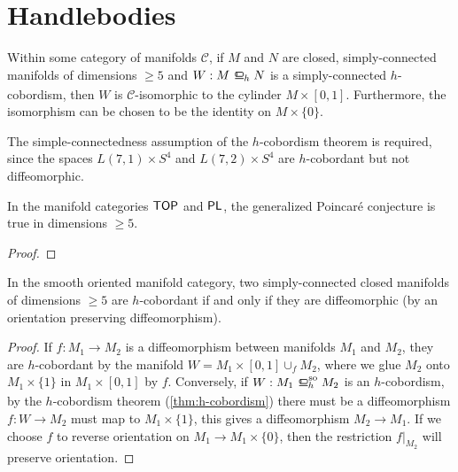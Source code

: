 \section{Handlebodies}

\begin{theorem}[$h$-cobordism]\label{thm:h-cobordism}
	Within some category of manifolds $\mathscr{C}$, if $M$ and $N$ are closed, simply-connected manifolds of dimensions $\geq 5$ and $W : M \hbord N$ is a simply-connected $h$-cobordism, then $W$ is $\mathscr{C}$-isomorphic to the cylinder $M\times [0,1]$. Furthermore, the isomorphism can be chosen to be the identity on $M\times \{0\}$.
\end{theorem}

\begin{example}
	The simple-connectedness assumption of the $h$-cobordism theorem is required, since the spaces $L(7,1)\times S^4$ and $L(7,2)\times S^4$ are $h$-cobordant but not diffeomorphic.
\end{example}

\begin{theorem}
	In the manifold categories $\mathsf{TOP}$ and $\mathsf{PL}$, the generalized Poincar\'e conjecture is true in dimensions $\geq 5$.
\end{theorem}
\begin{proof}
\end{proof}

\begin{corollary}\label{thm:h-cobordism-diffeomorphism}
	In the smooth oriented manifold category, two simply-connected closed manifolds of dimensions $\geq 5$ are $h$-cobordant if and only if they are diffeomorphic (by an orientation preserving diffeomorphism).
\end{corollary}
\begin{proof}
	If $f : M_1 \to M_2$ is a diffeomorphism between manifolds $M_1$ and $M_2$, they are $h$-cobordant by the manifold $W=M_1\times [0,1]\cup_f M_2$, where we glue $M_2$ onto $M_1\times \{1\}$ in $M_1\times [0,1]$ by $f$.
	Conversely, if $W : M_1\sohbord M_2$ is an $h$-cobordism, by the $h$-cobordism theorem (\ref{thm:h-cobordism}) there must be a diffeomorphism $f : W \to M_2$ must map to $M_1\times \{1\}$, this gives a diffeomorphism $M_2 \to M_1$. If we choose $f$ to reverse orientation on $M_1\to M_1\times \{0\}$, then the restriction $f|_{M_2}$ will preserve orientation.
\end{proof}

